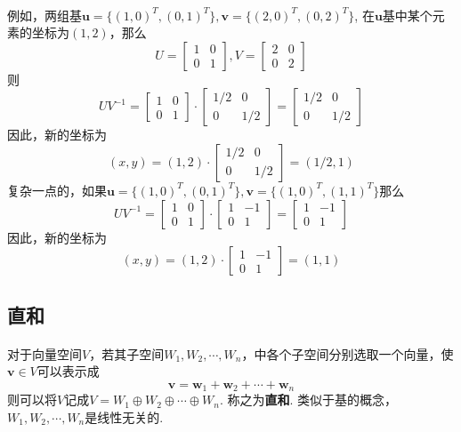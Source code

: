 \paragraph{}
例如，两组基$ \textbf{u} = \{ (1, 0)^T, (0, 1)^T \}, \textbf{v} = \{ (2, 0)^T, (0, 2)^T \} $, 在$\textbf{u}$基中某个元素的坐标为$(1, 2)$，那么
$$
U = \begin{bmatrix}
   1 & 0 \\
   0 & 1  
  \end{bmatrix}, V = \begin{bmatrix}
   2 & 0 \\
   0 & 2 
  \end{bmatrix}
$$
则
$$
U V^{-1} =  \begin{bmatrix}
   1 & 0 \\
   0 & 1  
  \end{bmatrix} \cdot  \begin{bmatrix}
   1/2 & 0 \\
   0 & 1/2
  \end{bmatrix} = \begin{bmatrix}
   1/2 & 0 \\
   0 & 1/2
  \end{bmatrix}
$$
因此，新的坐标为
$$
(x, y) = (1, 2) \cdot \begin{bmatrix}
   1/2 & 0 \\
   0 & 1/2
  \end{bmatrix} = (1/2, 1)
$$
复杂一点的，如果$ \textbf{u} = \{ (1, 0)^T, (0, 1)^T \}, \textbf{v} = \{ (1, 0)^T, (1, 1)^T \} $那么
$$
U V^{-1} =  \begin{bmatrix}
   1 & 0 \\
   0 & 1  
  \end{bmatrix} \cdot  \begin{bmatrix}
  1  & -1 \\
   0 & 1
  \end{bmatrix} = \begin{bmatrix}
   1 & -1 \\
   0 & 1
  \end{bmatrix}
$$
因此，新的坐标为
$$
(x, y) = (1, 2) \cdot \begin{bmatrix}
   1 & -1 \\
   0 & 1
  \end{bmatrix} = (1, 1)
$$

\subsection{直和}
\paragraph{}
对于向量空间$V$，若其子空间$W_1, W_2, \cdots, W_n$，中各个子空间分别选取一个向量，使$\textbf{v} \in V$可以表示成
$$
\textbf{v} = \textbf{w}_1 + \textbf{w}_2 + \cdots + \textbf{w}_n
$$
则可以将$V$记成$V = W_1 \oplus W_2 \oplus \cdots \oplus W_n$. 称之为\textbf{直和}. 类似于基的概念，$W_1, W_2, \cdots, W_n$是线性无关的. 

